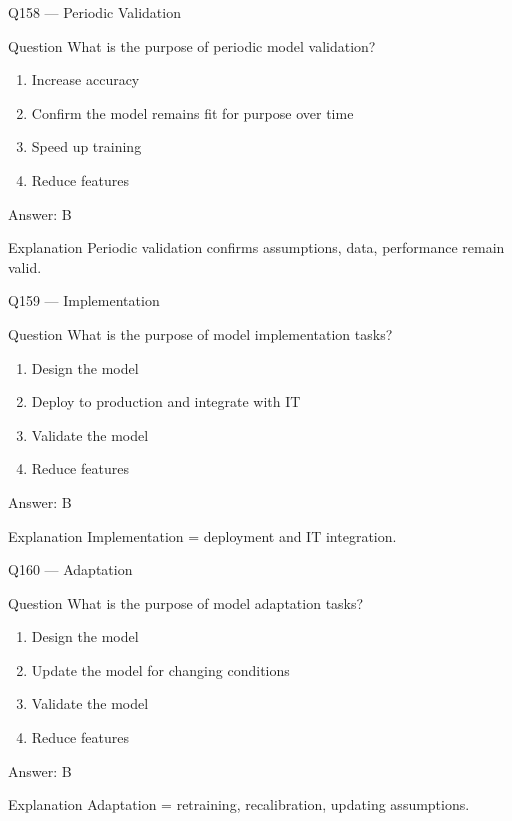 \documentclass[aspectratio=169,8pt]{beamer}
\begin{document}
	\begin{frame}{Q158 --- Periodic Validation}
		\begin{block}{Question}
			What is the purpose of periodic model validation?
		\end{block}
		\begin{enumerate}
			\item Increase accuracy
			\item Confirm the model remains fit for purpose over time
			\item Speed up training
			\item Reduce features
		\end{enumerate}
		\begin{exampleblock}{Answer: B}\end{exampleblock}
		\begin{block}{Explanation}
			Periodic validation confirms assumptions, data, performance remain valid.
		\end{block}
	\end{frame}
	
	\begin{frame}{Q159 --- Implementation}
		\begin{block}{Question}
			What is the purpose of model implementation tasks?
		\end{block}
		\begin{enumerate}
			\item Design the model
			\item Deploy to production and integrate with IT
			\item Validate the model
			\item Reduce features
		\end{enumerate}
		\begin{exampleblock}{Answer: B}\end{exampleblock}
		\begin{block}{Explanation}
			Implementation = deployment and IT integration.
		\end{block}
	\end{frame}
	
	\begin{frame}{Q160 --- Adaptation}
		\begin{block}{Question}
			What is the purpose of model adaptation tasks?
		\end{block}
		\begin{enumerate}
			\item Design the model
			\item Update the model for changing conditions
			\item Validate the model
			\item Reduce features
		\end{enumerate}
		\begin{exampleblock}{Answer: B}\end{exampleblock}
		\begin{block}{Explanation}
			Adaptation = retraining, recalibration, updating assumptions.
		\end{block}
	\end{frame}
	
\end{document}
